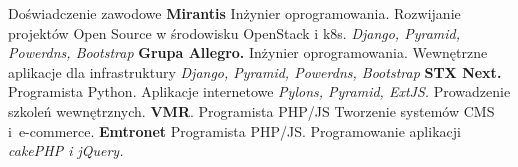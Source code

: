 \begin{rubric}{Doświadczenie zawodowe}
\textbf{Mirantis}\newline
    Inżynier oprogramowania.\newline
    Rozwijanie projektów Open Source w środowisku OpenStack i k8s.
    \textit{Django, Pyramid, Powerdns, Bootstrap}
\entry*[X 2013 -- II 2016]\textbf{Grupa Allegro.}\newline
    Inżynier oprogramowania.\newline
    Wewnętrzne aplikacje dla infrastruktury\newline
    \textit{Django, Pyramid, Powerdns, Bootstrap}
\entry*[V 2011 -- IX 2013]\textbf{STX Next.}\newline
    Programista Python.\newline
    Aplikacje internetowe \newline
    \textit{Pylons, Pyramid, ExtJS.}\newline
    Prowadzenie szkoleń wewnętrznych.
\entry*[XII 2009 -- IV 2011]\textbf{VMR}.
    Programista PHP/JS\newline
    Tworzenie systemów CMS i~\hbox{e-commerce}.
\entry*[VI 2009 -- XII 2009]\textbf{Emtronet} Programista PHP/JS.\newline
    Programowanie aplikacji\newline
    \textit{cakePHP i jQuery.}
\end{rubric}
